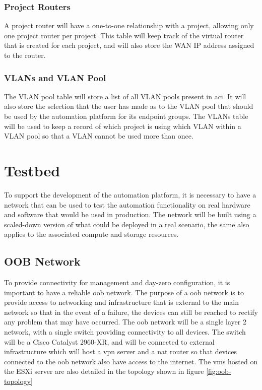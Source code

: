 \subsubsection{Project Routers}
\label{design:web-application:database:project-routers}
A project router will
have a one-to-one relationship with a project, allowing only one project router
per project. This table will keep track of the virtual router that is created
for each project, and will also store the WAN IP address assigned to the
router.

\subsubsection{VLANs and VLAN Pool}
\label{design:web-application:database:vlan-and-vlan-pool}
The VLAN pool table
will store a list of all VLAN pools present in \gls{aci}. It will also store
the selection that the user has made as to the VLAN pool that should be used by
the automation platform for its endpoint groups. The VLANs table will be used
to keep a record of which project is using which VLAN within a VLAN pool so
that a VLAN cannot be used more than once.

\section{Testbed}
\label{design:Testbed}
To support the development of the automation platform,
it is necessary to have a network that can be used to test the automation
functionality on real hardware and software that would be used in production.
The network will be built using a scaled-down version of what could be deployed
in a real scenario, the same also applies to the associated compute and storage
resources.

\subsection{OOB Network}
\label{design:Testbed:network-design:oob}
To provide connectivity for management and day-zero configuration, it is
important to have a reliable \gls{oob} network. The purpose of a \gls{oob}
network is to provide access to networking and infrastructure that is external
to the main network so that in the event of a failure, the devices can still be
reached to rectify any problem that may have occurred. The \gls{oob} network
will be a single layer 2 network, with a single switch providing connectivity
to all devices. The switch will be a Cisco Catalyst 2960-XR, and will be
connected to external infrastructure which will host a \gls{vpn} server and a
\gls{nat} router so that devices connected to the \gls{oob} network also have
access to the internet. The \gls{vm}s hosted on the ESXi server are also
detailed in the topology shown in figure \ref{fig:oob-topology}


